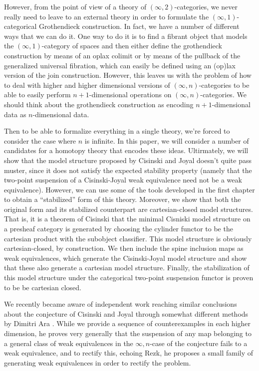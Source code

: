 \documentclass{amsbook}
\theoremstyle{plain}   %
\theoremstyle{remark}
\theoremstyle{plain}
\numberwithin{section}{chapter}
\begin{document}
However, from the point of view of a theory of \((\infty,2)\)-categories, we never really need to leave to an external theory in order to formulate the \((\infty,1)\)-categorical Grothendieck construction.  In fact, we have a number of different ways that we can do it.  One way to do it is to find a fibrant object that models the  \((\infty,1)\)-category of spaces and then either define the grothendieck construction by means of an oplax colimit or by means of the pullback of the generalized universal fibration, which can easily be defined using an (op)lax version of the join construction. However, this leaves us with the problem of how to deal with higher and higher dimensional versions of \((\infty, n)\)-categories to be able to easily perform \(n+1\)-dimensional operations on \((\infty,n)\)-categories.  We should think about the grothendieck construction as encoding \(n+1\)-dimensional data as \(n\)-dimensional data.  

Then to be able to formalize everything in a single theory, we're forced to consider the case where \(n\) is infinite.  In this paper, we will consider a number of candidates for a homotopy theory that encodes these ideas.  Ultirmately, we will show that the model structure proposed by Cisinski and Joyal doesn't quite pass muster, since it does not satisfy the expected stability property (namely that the two-point suspension of a Cisinski-Joyal weak equivalence need not be a weak equivalence).  However, we can use some of the tools developed in the first chapter to obtain a ``stabilized'' form of this theory.  Moreover, we show that both the original form and its stabilized counterpart are cartesian-closed model structures.  That is, it is a theorem of Cisinski that the minimal Cisniski model structure on a presheaf category is generated by choosing the cylinder functor to be the cartesian product with the subobject classifier.  This model structure is obviously cartesian-closed, by construction.  We then include the spine inclusion maps as weak equivalences, which generate the Cisinski-Joyal model structure and show that these also generate a cartesian model structure.   Finally, the stabilization of this model structure under the categorical two-point suspension functor is proven to be be cartesian closed.

We recently became aware of independent work reaching similar conclusions about the conjecture of Cisinski and Joyal through somewhat different methods by Dimitri Ara \cite{ara-new}.  While we provide a sequence of counterexamples in each higher dimension, he proves very generally that the suspension of any map belonging to a general class of weak equivalences in the \(\infty,n\)-case of the conjecture fails to a weak equivalence, and to rectify this, echoing Rezk, he proposes a small family of generating weak equivalences in order to rectify the problem.  
\end{document}
